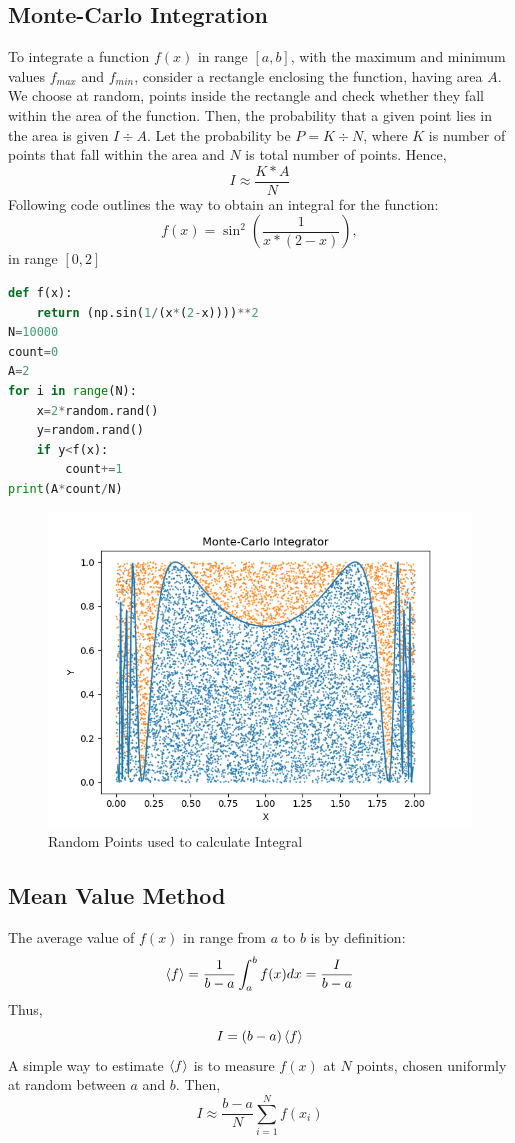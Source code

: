\subsection{Monte-Carlo Integration}
To integrate a function $f(x)$ in range $[a,b]$, with the maximum and minimum values $f_{max}$ and $f_{min}$, consider a rectangle enclosing the function, having area $A$. We choose at random, points inside the rectangle and check whether they fall within the area of the function. Then, the probability that a given point lies in the area is given $I\div A$. Let the probability be $P=K \div N$, where $K$ is number of points that fall within the area and $N$ is total number of points. Hence,
$$I \approx \dfrac{K*A}{N}$$
Following code outlines the way to obtain an integral for the function:
$$f(x) = \sin^{2} \left(\dfrac{1}{x*(2-x)}\right),$$ in range $[0,2]$
\begin{lstlisting}[language=Python, caption=Monte Carlo Integration, frame=single, label={lst:montecarlo} ]
def f(x):
	return (np.sin(1/(x*(2-x))))**2
N=10000
count=0
A=2
for i in range(N):
	x=2*random.rand()
	y=random.rand()
	if y<f(x):
		count+=1
print(A*count/N)
\end{lstlisting}
\begin{figure}[H]
	\centering
	\includegraphics[width=0.7\linewidth]{MonteCarlo}
	\caption{Random Points used to calculate Integral}
	\label{fig:montecarlo}
\end{figure}
\subsection{Mean Value Method}
The average value of $f(x)$ in range from $a$ to $b$ is by definition:
$$\braket{f}= \dfrac{1}{b-a}\int_{a}^{b}f(x)dx=\dfrac{I}{b-a}$$
Thus, $$I = (b-a)\braket{f}$$
A simple way to estimate $\braket{f}$ is to measure $f(x)$ at $N$ points, chosen uniformly at random between $a$ and $b$. Then,
$$I \approx \dfrac{b-a}{N}\sum_{i=1}^{N}f(x_{i})$$




